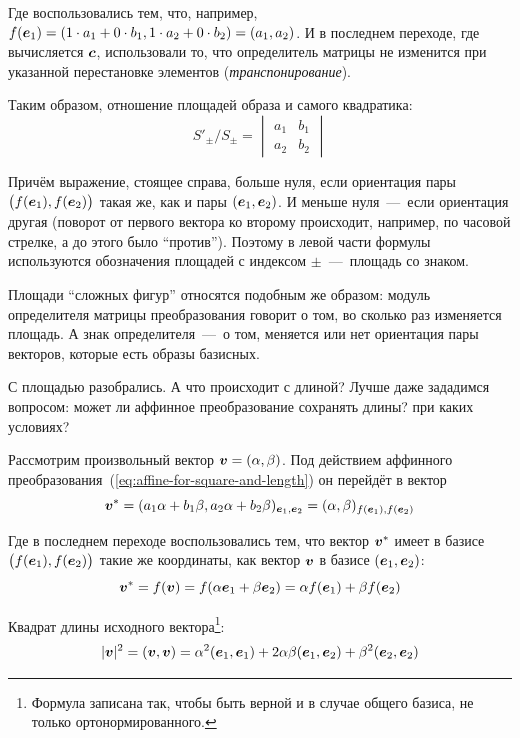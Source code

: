 \documentclass[a4paper,12pt]{article}
\begin{document}
  Где воспользовались тем, что, например, $f(\bds e_1) \hm= (1 \hm\cdot a_1 \hm+ 0 \hm\cdot b_1, 1 \hm\cdot a_2 \hm+ 0 \hm\cdot b_2) \hm= (a_1, a_2)$.
  И в последнем переходе, где вычисляется $\boldsymbol c$, использовали то, что определитель матрицы не изменится при указанной перестановке элементов (\emph{транспонирование}).
  
  Таким образом, отношение площадей образа и самого квадратика:
  \[
    S'_{\pm}/S_{\pm} = \begin{vmatrix}
      a_1 & b_1\\
      a_2 & b_2
    \end{vmatrix}
  \]
  
  Причём выражение, стоящее справа, больше нуля, если ориентация пары $\bigl(f(\boldsymbol e_1), f(\boldsymbol e_2)\bigr)$ такая же, как и пары $(\boldsymbol e_1, \boldsymbol e_2)$.
  И меньше нуля~---~если ориентация другая (поворот от первого вектора ко второму происходит, например, по часовой стрелке, а до этого было ``против'').
  Поэтому в левой части формулы используются обозначения площадей с индексом $\pm$~---~площадь со знаком.
  
  Площади ``сложных фигур'' относятся подобным же образом: модуль определителя матрицы преобразования говорит о том, во сколько раз изменяется площадь.
  А знак определителя~---~о том, меняется или нет ориентация пары векторов, которые есть образы базисных.
  
  
  \bigskip
  
  С площадью разобрались.
  А что происходит с длиной?
  Лучше даже зададимся вопросом: может ли аффинное преобразование сохранять длины? при каких условиях?
  
  Рассмотрим произвольный вектор $\bds v \hm= (\alpha, \beta)$.
  Под действием аффинного преобразования~(\ref{eq:affine-for-square-and-length}) он перейдёт в вектор
  \[
    \boldsymbol v^* = (a_1 \alpha + b_1 \beta, a_2 \alpha + b_2 \beta)_{\boldsymbol e_1, \boldsymbol e_2}
             = (\alpha, \beta)_{f(\boldsymbol e_1), f(\boldsymbol e_2)}
  \]
  
  Где в последнем переходе воспользовались тем, что вектор $\boldsymbol v^*$ имеет в базисе $\bigl(f(\boldsymbol e_1), f(\boldsymbol e_2)\bigr)$ такие же координаты, как вектор $\boldsymbol v$ в базисе $(\boldsymbol e_1, \boldsymbol e_2)$:
  \[
    \boldsymbol v^* = f(\boldsymbol v) = f(\alpha \boldsymbol e_1 + \beta \boldsymbol e_2) = \alpha f(\boldsymbol e_1) + \beta f(\boldsymbol e_2)
  \]
  
  Квадрат длины исходного вектора\footnote{Формула записана так, чтобы быть верной и в случае общего базиса, не только ортонормированного.}:
  \[
    |\boldsymbol v|^2 = (\boldsymbol v, \boldsymbol v) = \alpha^2 (\boldsymbol e_1, \boldsymbol e_1) + 2 \alpha \beta (\boldsymbol e_1, \boldsymbol e_2) + \beta^2 (\boldsymbol e_2, \boldsymbol e_2)
  \]
  
\end{document}
